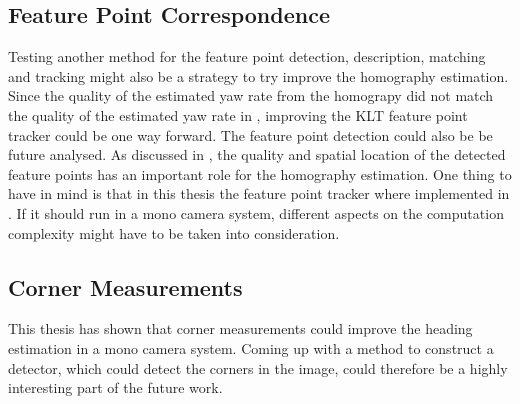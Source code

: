 \subsection{Feature Point Correspondence}
Testing another method for the feature point detection, description, matching and tracking might also be a strategy to try improve the homography estimation.
Since the quality of the estimated yaw rate from the homograpy did not match the quality of the estimated yaw rate in \cite{Gabb:2013}, improving the KLT feature point tracker could be one way forward.
The feature point detection could also be be future analysed.
As discussed in , the quality and spatial location of the detected feature points has an important role for the homography estimation.
One thing to have in mind is that in this thesis the feature point tracker where implemented in \matlab.
If it should run in a mono camera system, different aspects on the computation complexity might have to be taken into consideration.

\subsection{Corner Measurements}
This thesis has shown that corner measurements could improve the heading estimation in a mono camera system.
Coming up with a method to construct a detector, which could detect the corners in the image, could therefore be a highly interesting part of the future work.